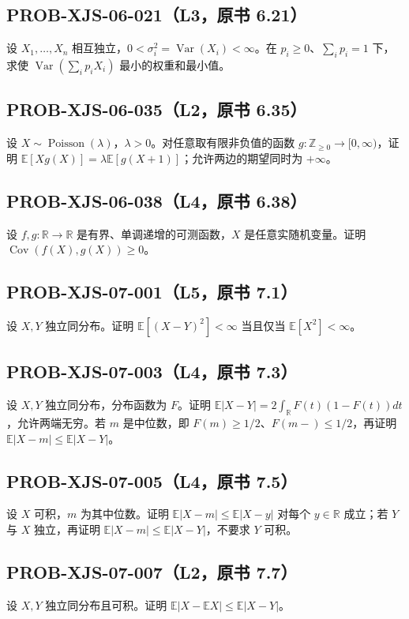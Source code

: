 \documentclass[UTF8]{ctexart}
\begin{document}
\subsection*{PROB-XJS-06-021（L3，原书 6.21）}
设 $X_1,\ldots,X_n$ 相互独立，$0<\sigma_i^2=\operatorname{Var}(X_i)<\infty$。在 $p_i\ge0$、$\sum_i p_i=1$ 下，求使 $\operatorname{Var}(\sum_i p_i X_i)$ 最小的权重和最小值。

\subsection*{PROB-XJS-06-035（L2，原书 6.35）}
设 $X\sim\operatorname{Poisson}(\lambda)$，$\lambda>0$。对任意取有限非负值的函数 $g:\mathbb Z_{\ge0}\to[0,\infty)$，证明 $\mathbb E[Xg(X)]=\lambda\mathbb E[g(X+1)]$；允许两边的期望同时为 $+\infty$。

\subsection*{PROB-XJS-06-038（L4，原书 6.38）}
设 $f,g:\mathbb R\to\mathbb R$ 是有界、单调递增的可测函数，$X$ 是任意实随机变量。证明 $\operatorname{Cov}(f(X),g(X))\ge0$。

\subsection*{PROB-XJS-07-001（L5，原书 7.1）}
设 $X,Y$ 独立同分布。证明 $\mathbb E[(X-Y)^2]<\infty$ 当且仅当 $\mathbb E[X^2]<\infty$。

\subsection*{PROB-XJS-07-003（L4，原书 7.3）}
设 $X,Y$ 独立同分布，分布函数为 $F$。证明 $\mathbb E|X-Y|=2\int_{\mathbb R}F(t)(1-F(t))dt$，允许两端无穷。若 $m$ 是中位数，即 $F(m)\ge1/2$、$F(m-)\le1/2$，再证明 $\mathbb E|X-m|\le\mathbb E|X-Y|$。

\subsection*{PROB-XJS-07-005（L4，原书 7.5）}
设 $X$ 可积，$m$ 为其中位数。证明 $\mathbb E|X-m|\le\mathbb E|X-y|$ 对每个 $y\in\mathbb R$ 成立；若 $Y$ 与 $X$ 独立，再证明 $\mathbb E|X-m|\le\mathbb E|X-Y|$，不要求 $Y$ 可积。

\subsection*{PROB-XJS-07-007（L2，原书 7.7）}
设 $X,Y$ 独立同分布且可积。证明 $\mathbb E|X-\mathbb EX|\le\mathbb E|X-Y|$。
\end{document}

